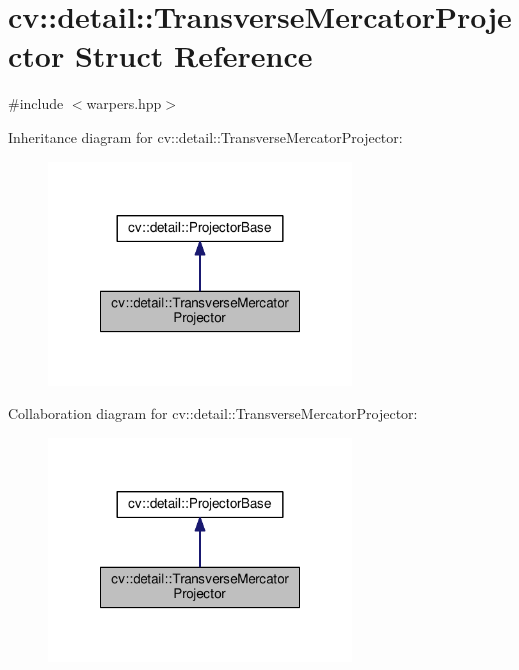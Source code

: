 \hypertarget{structcv_1_1detail_1_1TransverseMercatorProjector}{\section{cv\-:\-:detail\-:\-:Transverse\-Mercator\-Projector Struct Reference}
\label{structcv_1_1detail_1_1TransverseMercatorProjector}
}


{\ttfamily \#include $<$warpers.\-hpp$>$}



Inheritance diagram for cv\-:\-:detail\-:\-:Transverse\-Mercator\-Projector\-:\nopagebreak
\begin{figure}[H]
\begin{center}
\leavevmode
\includegraphics[width=228pt]{structcv_1_1detail_1_1TransverseMercatorProjector__inherit__graph}
\end{center}
\end{figure}


Collaboration diagram for cv\-:\-:detail\-:\-:Transverse\-Mercator\-Projector\-:\nopagebreak
\begin{figure}[H]
\begin{center}
\leavevmode
\includegraphics[width=228pt]{structcv_1_1detail_1_1TransverseMercatorProjector__coll__graph}
\end{center}
\end{figure}
